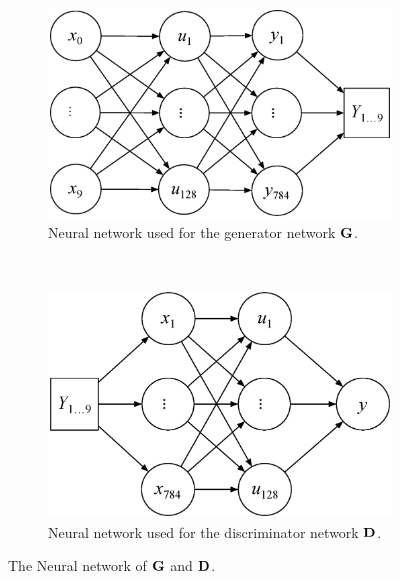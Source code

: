 \documentclass[../main.tex]{subfiles}
\begin{document}
\begin{figure}
    \centering
    \begin{subfigure}[b]{0.48\textwidth}
    	\centering
	    \includegraphics[width=\textwidth]{figures/wgan/generator}
	    \caption{Neural network used for the generator network $\mathbf{G}$.}
	    \label{fig:g}
    \end{subfigure}
    ~
    \begin{subfigure}[b]{0.48\textwidth}
    	\centering
	    \includegraphics[width=\textwidth]{figures/wgan/discriminator}
	    \caption{Neural network used for the discriminator network $\mathbf{D}$.}
	    \label{fig:g}
    \end{subfigure}
    \caption{The Neural network of $\mathbf{G}$ and $\mathbf{D}$.}
\end{figure}
\end{document}
